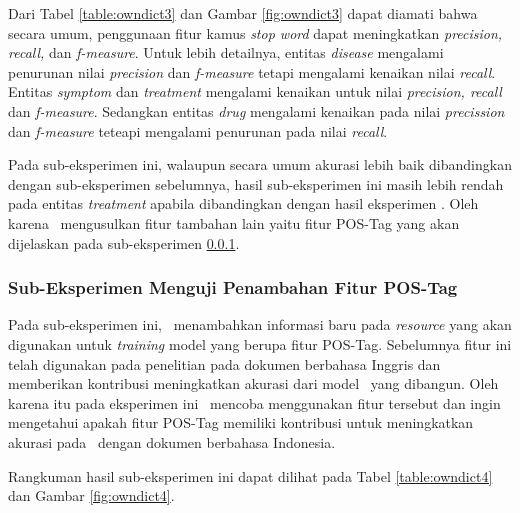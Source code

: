 	Dari Tabel \ref{table:owndict3} dan Gambar \ref{fig:owndict3} dapat diamati bahwa secara umum, penggunaan fitur kamus \textit{stop word} dapat meningkatkan \textit{precision, recall,} dan \textit{f-measure}. Untuk lebih detailnya, entitas \textit{disease} mengalami penurunan nilai \textit{precision} dan \textit{f-measure} tetapi mengalami kenaikan nilai \textit{recall}. Entitas \textit{symptom} dan \textit{treatment} mengalami kenaikan untuk nilai \textit{precision, recall} dan \textit{f-measure}. Sedangkan entitas \textit{drug} mengalami kenaikan pada nilai \textit{precission} dan \textit{f-measure} teteapi mengalami penurunan pada nilai \textit{recall}.
		
	Pada sub-eksperimen ini, walaupun secara umum akurasi lebih baik dibandingkan dengan sub-eksperimen sebelumnya, hasil sub-eksperimen ini masih lebih rendah pada entitas \textit{treatment} apabila dibandingkan dengan hasil eksperimen \cite{skripsiKakRadit}. Oleh karena \saya~mengusulkan fitur tambahan lain yaitu fitur POS-Tag yang akan dijelaskan pada sub-eksperimen \ref{eks:subekspostag}.
	
	\subsubsection{Sub-Eksperimen Menguji Penambahan Fitur POS-Tag}\label{eks:subekspostag}
	Pada sub-eksperimen ini, \saya~menambahkan informasi baru pada \textit{resource} yang akan digunakan untuk \textit{training} model yang berupa fitur POS-Tag. Sebelumnya fitur ini telah digunakan pada penelitian \cite{abacha2011medical} pada dokumen berbahasa Inggris dan memberikan kontribusi meningkatkan akurasi dari model \mer~yang dibangun. Oleh karena itu pada eksperimen ini \saya~mencoba menggunakan fitur tersebut dan ingin mengetahui apakah fitur POS-Tag memiliki kontribusi untuk meningkatkan akurasi pada \mer~dengan dokumen berbahasa Indonesia. 
	
	Rangkuman hasil sub-eksperimen ini dapat dilihat pada Tabel \ref{table:owndict4} dan Gambar \ref{fig:owndict4}.
	
